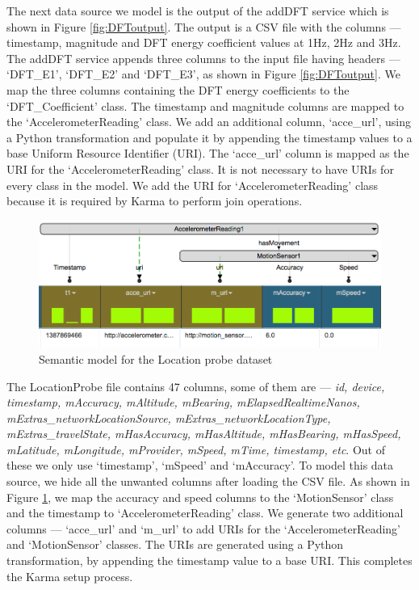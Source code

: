 The next data source we model is the output of the addDFT service which is shown in Figure \ref{fig:DFToutput}. The output is a CSV file with the columns --- timestamp, magnitude and DFT energy coefficient values at 1Hz, 2Hz and 3Hz. The addDFT service appends three columns to the input file having headers --- `DFT\_E1', `DFT\_E2' and `DFT\_E3', as shown in Figure \ref{fig:DFToutput}. We map the three columns containing the DFT energy coefficients to the `DFT\_Coefficient' class. The timestamp and magnitude columns are mapped to the `AccelerometerReading' class. We add an additional column, `acce\_url', using a Python transformation and populate it by appending the timestamp values to a base Uniform Resource Identifier (URI). The `acce\_url' column is mapped as the URI for the `AccelerometerReading' class. It is not necessary to have URIs for every class in the model. We add the URI for `AccelerometerReading' class because it is required by Karma to perform join operations.

\begin{figure}[ht!]
\centering
\includegraphics[width=130mm]{img/motionSensorModel}
\caption{Semantic model for the Location probe dataset}
\label{fig:motionSensorModel}
\end{figure}

The LocationProbe file contains 47 columns, some of them are --- \textit{id, device, timestamp, mAccuracy, mAltitude, mBearing, mElapsedRealtimeNanos, mExtras\_networkLocationSource, mExtras\_networkLocationType, mExtras\_travelState, mHasAccuracy, mHasAltitude, mHasBearing, mHasSpeed, mLatitude, mLongitude, mProvider, mSpeed, mTime, timestamp, etc}. Out of these we only use `timestamp', `mSpeed' and `mAccuracy'. To model this data source, we hide all the unwanted columns after loading the CSV file. As shown in Figure \ref{fig:motionSensorModel}, we map the accuracy and speed columns to the `MotionSensor' class and the timestamp to `AccelerometerReading' class. We generate two additional columns --- `acce\_url' and `m\_url' to add URIs for the `AccelerometerReading' and `MotionSensor' classes. The URIs are generated using a Python transformation, by appending the timestamp value to a base URI. This completes the Karma setup process.

